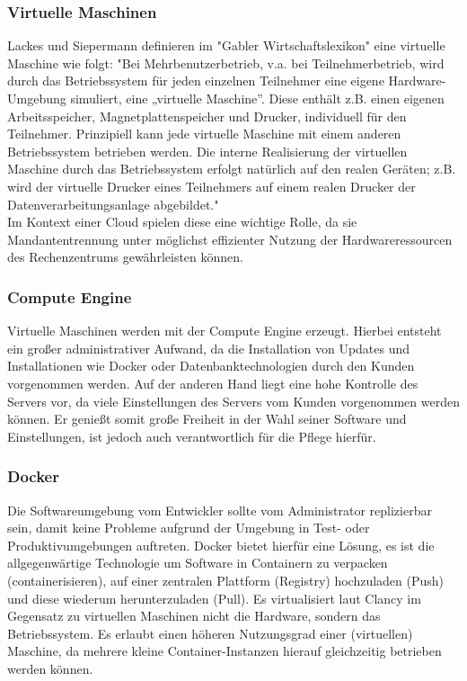 \documentclass[pdftex,a4paper,abstracton,11pt,parskip=half,bibtotocnumbered]{scrartcl}
\begin{document}
		\subsubsection{Virtuelle Maschinen}
			Lackes und Siepermann definieren im "Gabler Wirtschaftslexikon" eine virtuelle Maschine wie folgt: "Bei Mehrbenutzerbetrieb, v.a. bei Teilnehmerbetrieb, wird durch
			das Betriebssystem für jeden einzelnen Teilnehmer eine eigene Hardware-Umgebung simuliert, eine „virtuelle Maschine”. Diese enthält z.B. einen eigenen Arbeitsspeicher, 
			Magnetplattenspeicher und Drucker, individuell für den Teilnehmer. Prinzipiell kann jede virtuelle Maschine mit einem anderen Betriebssystem betrieben
			werden. Die interne Realisierung der virtuellen Maschine durch das Betriebssystem erfolgt natürlich auf den realen Geräten; z.B. wird der virtuelle Drucker
			eines Teilnehmers auf einem realen Drucker der Datenverarbeitungsanlage abgebildet." \cite{gabler-vm} \\
			Im Kontext einer Cloud spielen diese eine wichtige Rolle, da sie Mandantentrennung unter möglichst effizienter Nutzung der Hardwareressourcen
			des Rechenzentrums gewährleisten können.
		
		\subsubsection{Compute Engine}
			Virtuelle Maschinen werden mit der Compute Engine erzeugt. Hierbei entsteht ein großer administrativer Aufwand, da die Installation von Updates und 
			Installationen wie Docker oder Datenbanktechnologien durch den Kunden vorgenommen werden. 
			Auf der anderen Hand liegt eine hohe Kontrolle des Servers vor, da viele Einstellungen des Servers vom Kunden vorgenommen werden können. Er genießt somit
			große Freiheit in der Wahl seiner Software und Einstellungen, ist jedoch auch verantwortlich für die Pflege hierfür.
	

		\subsubsection{Docker}
			Die Softwareumgebung vom Entwickler sollte vom Administrator replizierbar sein, damit keine Probleme aufgrund der Umgebung in Test- oder Produktivumgebungen 
			auftreten. Docker bietet hierfür eine Lösung, es ist die allgegenwärtige Technologie \cite[vgl. S.40]{Venema} um Software in Containern zu verpacken (containerisieren), 
			auf einer zentralen Plattform (Registry) hochzuladen (Push) und diese wiederum herunterzuladen (Pull). Es virtualisiert laut Clancy im Gegensatz zu virtuellen Maschinen
			nicht die Hardware, sondern das Betriebssystem. \cite[vgl.]{docker-virtualization} Es erlaubt einen höheren Nutzungsgrad einer (virtuellen) Maschine, da mehrere 
			kleine Container-Instanzen hierauf gleichzeitig betrieben werden können.
\end{document}
